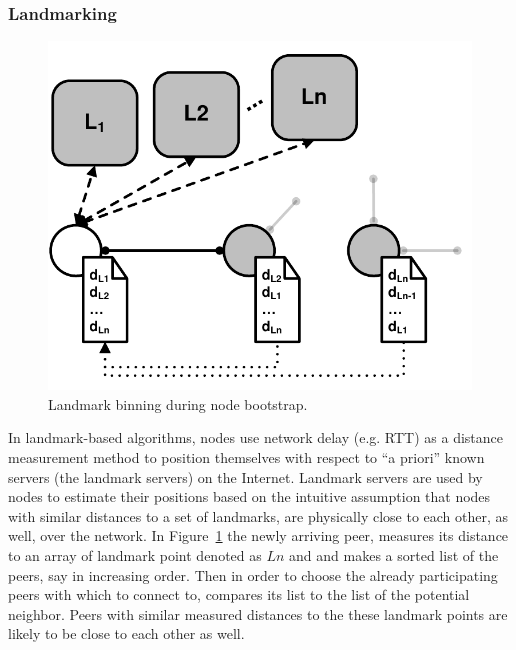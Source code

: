\subsubsection{Landmarking}\label{sec:landmark}

\begin{figure}[ht]
\centering
  \includegraphics[scale=0.4]{img/pdf/landmarking.pdf}
\caption{Landmark binning during node bootstrap.}
\label{figure:landmarking}
\end{figure}

In landmark-based algorithms, nodes use network delay (e.g. RTT) as a
distance measurement method to position themselves with respect to ``a priori''
known servers (the landmark servers) on the Internet. Landmark servers are used
by nodes to estimate their positions based on the intuitive assumption that
nodes
with similar distances to a set of landmarks, are physically close to each
other, as well, over the network. In Figure~\ref{figure:landmarking} the newly
arriving peer, measures its distance to an array of landmark point denoted as
$Ln$ and and makes a sorted list of the peers, say in increasing order. Then in
order to choose the already participating peers with which to connect to,
compares its list to the list of the potential neighbor. Peers with similar
measured distances to the these landmark points are likely to be close to
each other as well.

